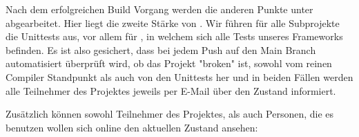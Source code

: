 Nach dem erfolgreichen Build Vorgang werden die anderen Punkte unter  abgearbeitet. Hier liegt die zweite Stärke von . Wir führen für alle Subprojekte die Unittests aus, vor allem für , in welchem sich alle Tests unseres Frameworks befinden.
Es ist also gesichert, dass bei jedem Push auf den Main Branch automatisiert überprüft wird, ob das Projekt "broken" ist, sowohl vom reinen Compiler Standpunkt als auch von den Unittests her und in beiden Fällen werden alle Teilnehmer des Projektes jeweils per E-Mail über den Zustand informiert.

Zusätzlich können sowohl Teilnehmer des Projektes, als auch Personen, die es benutzen wollen sich online den aktuellen Zustand ansehen:

